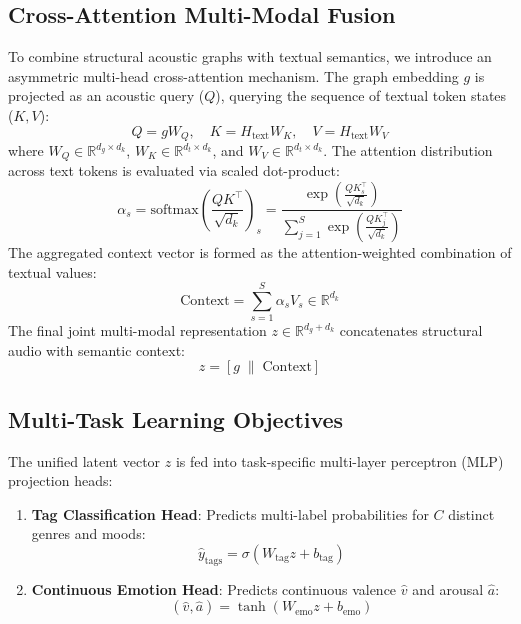 \documentclass{article}
\begin{document}
\subsection{Cross-Attention Multi-Modal Fusion}
To combine structural acoustic graphs with textual semantics, we introduce an asymmetric multi-head cross-attention mechanism. The graph embedding $g$ is projected as an acoustic query ($Q$), querying the sequence of textual token states ($K, V$):
\begin{equation}
Q = g W_Q, \quad K = H_{\text{text}} W_K, \quad V = H_{\text{text}} W_V
\end{equation}
where $W_Q \in \mathbb{R}^{d_g \times d_k}$, $W_K \in \mathbb{R}^{d_t \times d_k}$, and $W_V \in \mathbb{R}^{d_t \times d_k}$. The attention distribution across text tokens is evaluated via scaled dot-product:
\begin{equation}
\alpha_s = \text{softmax}\left( \frac{Q K^\top}{\sqrt{d_k}} \right)_s = \frac{\exp\left( \frac{Q K_s^\top}{\sqrt{d_k}} \right)}{\sum_{j=1}^S \exp\left( \frac{Q K_j^\top}{\sqrt{d_k}} \right)}
\end{equation}
The aggregated context vector is formed as the attention-weighted combination of textual values:
\begin{equation}
\text{Context} = \sum_{s=1}^S \alpha_s V_s \in \mathbb{R}^{d_k}
\end{equation}
The final joint multi-modal representation $z \in \mathbb{R}^{d_g + d_k}$ concatenates structural audio with semantic context:
\begin{equation}
z = \left[ g \;\|\; \text{Context} \right]
\end{equation}

\subsection{Multi-Task Learning Objectives}
The unified latent vector $z$ is fed into task-specific multi-layer perceptron (MLP) projection heads:
\begin{enumerate}
    \item \textbf{Tag Classification Head}: Predicts multi-label probabilities for $C$ distinct genres and moods:
    \begin{equation}
    \hat{y}_{\text{tags}} = \sigma\left( W_{\text{tag}} z + b_{\text{tag}} \right)
    \end{equation}
    \item \textbf{Continuous Emotion Head}: Predicts continuous valence $\hat{v}$ and arousal $\hat{a}$:
    \begin{equation}
    (\hat{v}, \hat{a}) = \tanh\left( W_{\text{emo}} z + b_{\text{emo}} \right)
    \end{equation}
\end{enumerate}
\end{document}
